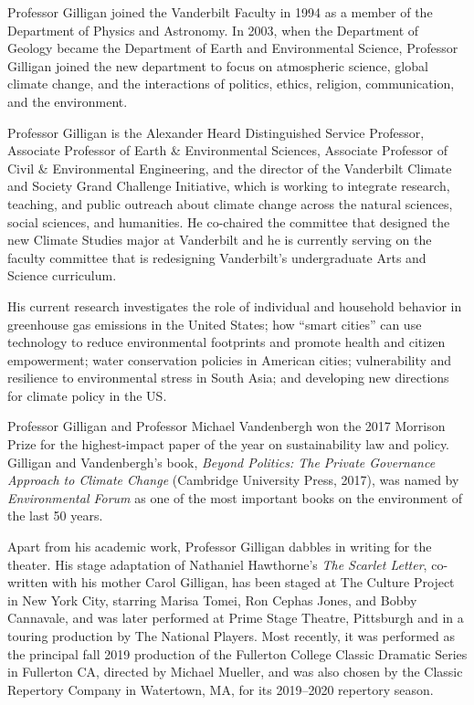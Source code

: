 \documentclass[11pt]{jgsyllabus}\usepackage[]{graphicx}\usepackage[]{xcolor}
\begin{document}
Professor Gilligan joined the Vanderbilt Faculty in 1994 as a member of the
Department of Physics and Astronomy. In 2003, when the Department of Geology
became the Department of Earth and Environmental Science, Professor Gilligan
joined the new department to focus on atmospheric science, global climate change,
and the interactions of politics, ethics, religion, communication, and the
environment.
\fi

Professor Gilligan is
the Alexander Heard Distinguished Service Professor,
Associate Professor of Earth \& Environmental Sciences,
Associate Professor of Civil \& Environmental Engineering, and
the director of the Vanderbilt Climate and Society Grand Challenge Initiative,
which is working to integrate research, teaching, and public outreach about
climate change across the natural sciences, social sciences, and humanities.
He co-chaired the committee that designed the new Climate Studies major at
Vanderbilt and he is currently serving on the faculty committee that is
redesigning Vanderbilt's undergraduate Arts and Science curriculum.

His current research investigates the role of individual and household behavior
in greenhouse gas emissions in the United States;
how ``smart cities'' can use technology to reduce environmental footprints and
promote health and citizen empowerment;
water conservation policies in American cities;
vulnerability and resilience to environmental stress in South Asia;
and developing new directions for climate policy in the US.

Professor Gilligan and Professor Michael Vandenbergh won
the 2017 Morrison Prize for the highest-impact paper of the year
on sustainability law and policy.
Gilligan and Vandenbergh's book, %
\emph{Beyond Politics: The Private Governance Approach to Climate Change\/}
(Cambridge University Press, 2017),
was named by \emph{Environmental Forum\/} as one of the most
important books on the environment of the last 50 years.

Apart from his academic work, Professor Gilligan dabbles in writing for the
theater. His stage adaptation of Nathaniel Hawthorne's %
\emph{The Scarlet Letter},
co-written with his mother Carol Gilligan, has been staged at The Culture
Project in New York City, starring
Marisa Tomei, Ron Cephas Jones, and Bobby Cannavale, and was later performed
at Prime Stage Theatre, Pittsburgh and in a touring production by The National
Players. Most recently, it was performed as the principal fall 2019 production
of the Fullerton College Classic Dramatic Series in Fullerton CA,
directed by Michael Mueller,
and was also chosen by the Classic Repertory Company in Watertown, MA,
for its 2019--2020 repertory season.
\end{document}
